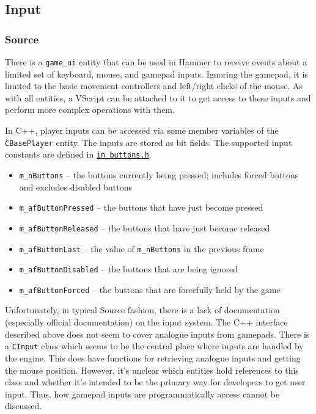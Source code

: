 \documentclass[a4paper, 12pt]{scrartcl}
\begin{document}
\subsection{Input}
\subsubsection{Source}
There is a \texttt{game\_ui} entity that can be used in Hammer to receive events about a limited set of keyboard, mouse, and gamepad inputs. Ignoring the gamepad, it is limited to the basic movement controllers and left/right clicks of the mouse. As with all entities, a VScript can be attached to it to get access to these inputs and perform more complex operations with them.

In C++, player inputs can be accessed via some member variables of the \texttt{CBasePlayer} entity. The inputs are stored as bit fields. The supported input constants are defined in \href{https://github.com/ValveSoftware/source-sdk-2013/blob/master/mp/src/game/shared/in_buttons.h}{\texttt{in\_buttons.h}}.

\begin{itemize}
  \item \texttt{m\_nButtons} -- the buttons currently being pressed; includes forced buttons and excludes disabled buttons
  \item \texttt{m\_afButtonPressed} -- the buttons that have just become pressed
  \item \texttt{m\_afButtonReleased} -- the buttons that have just become released
  \item \texttt{m\_afButtonLast} -- the value of \texttt{m\_nButtons} in the previous frame
  \item \texttt{m\_afButtonDisabled} -- the buttons that are being ignored
  \item \texttt{m\_afButtonForced} -- the buttons that are forcefully held by the game
\end{itemize}

Unfortunately, in typical Source fashion, there is a lack of documentation (especially official documentation) on the input system. The C++ interface described above does not seem to cover analogue inputs from gamepads. There is a \texttt{CInput} class which seems to be the central place where inputs are handled by the engine. This does have functions for retrieving analogue inputs and getting the mouse position. However, it's unclear which entities hold references to this class and whether it's intended to be the primary way for developers to get user input. Thus, how gamepad inputs are programmatically access cannot be discussed.
\end{document}
